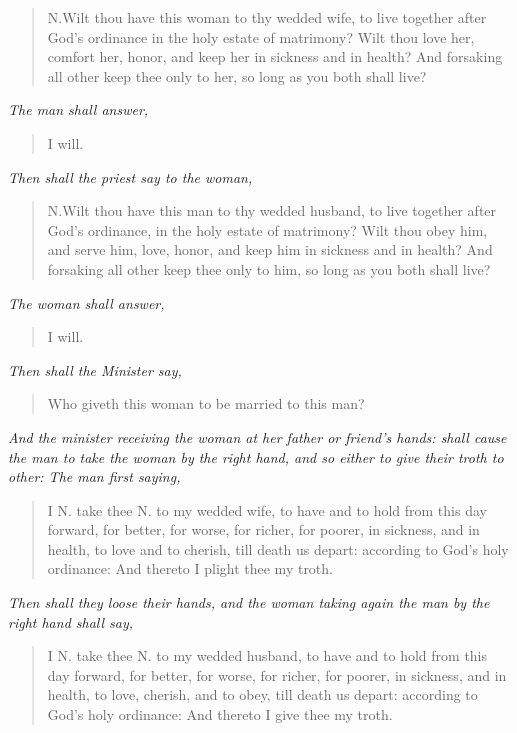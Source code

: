 \documentclass[
]{book}
\begin{document}
\begin{quote}
N.Wilt thou have this woman to thy wedded wife, to live together after God's ordinance in the holy estate of matrimony? Wilt thou love her, comfort her, honor, and keep her in sickness and in health? And forsaking all other keep thee only to her, so long as you both shall live?
\end{quote}

\emph{The man shall answer,}

\begin{quote}
I will.
\end{quote}

\emph{Then shall the priest say to the woman,}

\begin{quote}
N.Wilt thou have this man to thy wedded husband, to live together after God's ordinance, in the holy estate of matrimony? Wilt thou obey him, and serve him, love, honor, and keep him in sickness and in health? And forsaking all other keep thee only to him, so long as you both shall live?
\end{quote}

\emph{The woman shall answer,}

\begin{quote}
I will.
\end{quote}

\emph{Then shall the Minister say,}

\begin{quote}
Who giveth this woman to be married to this man?
\end{quote}

\emph{And the minister receiving the woman at her father or friend's hands: shall cause the man to take the woman by the right hand, and so either to give their troth to other: The man first saying,}

\begin{quote}
I N. take thee N. to my wedded wife, to have and to hold from this day forward, for better, for worse, for richer, for poorer, in sickness, and in health, to love and to cherish, till death us depart: according to God's holy ordinance: And thereto I plight thee my troth.
\end{quote}

\emph{Then shall they loose their hands, and the woman taking again the man by the right hand shall say,}

\begin{quote}
I N. take thee N. to my wedded husband, to have and to hold from this day forward, for better, for worse, for richer, for poorer, in sickness, and in health, to love, cherish, and to obey, till death us depart: according to God's holy ordinance: And thereto I give thee my troth.
\end{quote}
\end{document}
